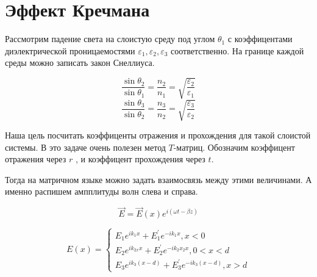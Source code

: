 \section{Эффект Кречмана}
\begin{center}
\end{center}



Рассмотрим падение света на слоистую среду под углом $ 
\theta_1 $ с коэффицентами  диэлектрической проницаемостями $ \varepsilon_1, \varepsilon_2, \varepsilon_3 $ соответственно. 
На границе каждой среды можно записать закон Снеллиуса.

	$$
	\frac{\sin{\theta_2}}{\sin{\theta_1}} = \frac{n_2}{n_1} =\sqrt{\frac{\varepsilon_{2}}{\varepsilon_1}}	$$
	$$
	\frac{{\sin\theta_3}}{\sin{\theta_2}} = \frac{n_3}{n_2} =\sqrt{\frac{\varepsilon_{3}}{\varepsilon_2}}	
	$$

Наша цель посчитать коэффиценты отражения и прохождения для такой слоистой системы. В это задаче очень полезен метод $ T $-матриц. Обозначим коэффицент отражения через $ r $ , и коэффицент прохождения через $ t $.

Тогда на матричном языке можно задать взаимосвязь между этими величинами. А именно распишем ампплитуды волн слева и справа.

$$\vec{E}=\vec{E}(x) e^{i(\omega t-\beta z)}$$

$$E(x)=\left\{\begin{array}{c}
E_{1} e^{i k_{1} x}+E_{1}^{\prime} e^{-i k_{1} x}, x<0 \\
E_{2} e^{i k_{2 x} x}+E_{2}^{\prime} e^{-i k_{2} x_{2} x}, 0<x<d \\
E_{3} e^{i k_{3}(x-d)}+E_{3}^{\prime} e^{-i k_{3}(x-d)}, x>d
\end{array}\right.$$

